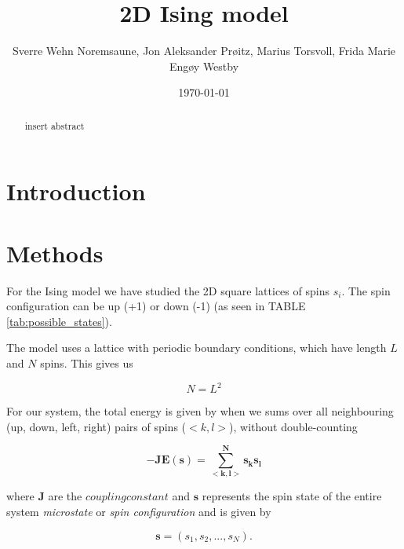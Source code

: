 \documentclass[english,notitlepage,reprint,nofootinbib]{revtex4-1}  %
\begin{document}
\title{2D Ising model}  %
\author{Sverre Wehn Noremsaune, Jon Aleksander Prøitz, Marius Torsvoll, Frida Marie Engøy Westby} %
\date{\today}                             %
\noaffiliation                            %

\begin{abstract}
    insert abstract
\end{abstract}
\maketitle


\section{Introduction}
%

\section{Methods}\label{sec:methods}
%
For the Ising model we have studied the 2D square lattices of spins $s_i$. The spin configuration can be up (+1) or down (-1) (as seen in TABLE \ref{tab:possible_states}).

The model uses a lattice with periodic boundary conditions, which have length $L$ and $N$ spins. This gives us

\begin{equation}
    N = L^2
\end{equation}

For our system, the total energy is given by when we sums over all neighbouring (up, down, left, right) pairs of spins ($<k,l>$), without double-counting

\begin{equation} \label{eq:tot_energy}
    \mathbf{- J E(\mathbf{s}) = \sum\limits_{<k,l>}^Ns_ks_l}
\end{equation}

where $\mathbf{J}$ are the $\mathit{coupling constant}$ and $\mathbf{s}$ represents the spin state of the entire system \textit{microstate} or \textit{spin configuration} and is given by 

\begin{equation}
    \mathbf{s} = \left( s_1, s_2, ... , s_N \right).
\end{equation}
\end{document}
